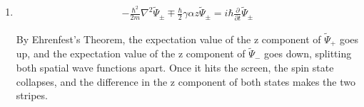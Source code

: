 \begin{enumerate}
\begin{align*}
         -\frac{\hbar}{2}\gamma \alpha z
         \tilde\Psi_+= 
         i\hbar \frac{\partial}{\partial t}
         \tilde\Psi_+
     \end{align*}
     \begin{align*}
         -\frac{\hbar^2}{2m}\nabla^2
         e^{-i\gamma B_0t/2}\tilde\Psi_-
         +\frac{\hbar}{2}\gamma\alpha x
         e^{i\gamma B_0t/2}\tilde\Psi_+ 
         +\frac{\hbar}{2}\gamma (B_0+\alpha z)
         e^{-i\gamma B_0t/2}\tilde\Psi_- = 
         i\hbar \frac{\partial}{\partial t}
         e^{-i\gamma B_0t/2}\tilde\Psi_-
     \end{align*}
     \begin{align*}
         -\frac{\hbar^2}{2m}\nabla^2
         \tilde\Psi_-
         +\frac{\hbar}{2}\gamma\alpha x
         e^{i\gamma B_0t}\tilde\Psi_+ 
         +\frac{\hbar}{2}\gamma \alpha z
         \tilde\Psi_- = 
         i\hbar \frac{\partial}{\partial t}
         \tilde\Psi_-
     \end{align*}
     \item 
     \begin{align*}
         -\frac{\hbar^2}{2m}
         \nabla^2\tilde\Psi_{\pm}
         \mp\frac{\hbar}{2}\gamma\alpha z\tilde\Psi_{\pm}
         =i\hbar\frac{\partial}{\partial t}\tilde\Psi_{\pm}
     \end{align*}

        By Ehrenfest's Theorem, the expectation value of the z component of $\tilde\Psi_+$ goes up, and the expectation value of the z component of $\tilde\Psi_-$ goes down, splitting both spatial wave functions apart. Once it hits the screen,
        the spin state collapses, and the difference in the z component of both states makes the two stripes.
 \end{enumerate}

